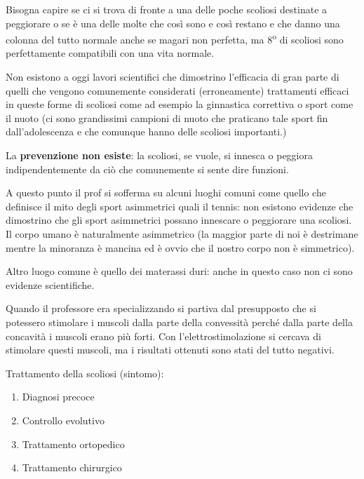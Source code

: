 Bisogna capire se ci si trova di fronte a una delle poche scoliosi
destinate a peggiorare o se è una delle molte che così sono e così
restano e che danno una colonna del tutto normale anche se magari non
perfetta, ma 8\textsuperscript{o} di scoliosi sono perfettamente compatibili con una vita
normale.

Non esistono a oggi lavori scientifici che dimostrino l'efficacia di
gran parte di quelli che vengono comunemente considerati (erroneamente)
trattamenti efficaci in queste forme di scoliosi come ad esempio la
ginnastica correttiva o sport come il nuoto (ci sono grandissimi
campioni di nuoto che praticano tale sport fin dall'adolescenza e che
comunque hanno delle scoliosi importanti.)

La \textbf{prevenzione non esiste}: la scoliosi, se vuole, si innesca o
peggiora indipendentemente da ciò che comunemente si sente dire
funzioni.

A questo punto il prof si sofferma su alcuni luoghi comuni come quello
che definisce il mito degli sport asimmetrici quali il tennis: non
esistono evidenze che dimostrino che gli sport asimmetrici possano
innescare o peggiorare una scoliosi. Il corpo umano è naturalmente
asimmetrico (la maggior parte di noi è destrimane mentre la minoranza è
mancina ed è ovvio che il nostro corpo non è simmetrico).

Altro luogo comune è quello dei materassi duri: anche in questo caso non
ci sono evidenze scientifiche.

Quando il professore era specializzando si partiva dal presupposto che
si potessero stimolare i muscoli dalla parte della convessità perché
dalla parte della concavità i muscoli erano più forti. Con
l'elettrostimolazione si cercava di stimolare questi muscoli, ma i
risultati ottenuti sono stati del tutto negativi.

Trattamento della scoliosi (sintomo):

\begin{enumerate}
\def\labelenumi{\arabic{enumi}.}
\item
  Diagnosi precoce
\item
  Controllo evolutivo
\item 
  Trattamento ortopedico
\item 
  Trattamento chirurgico
\end{enumerate}
